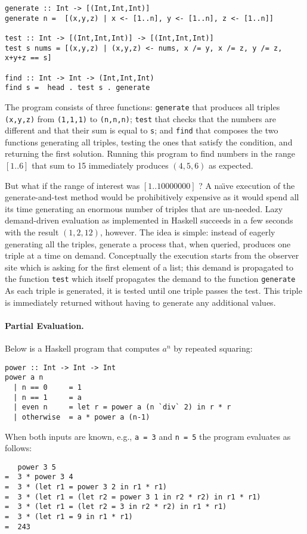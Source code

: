 \documentclass[sigplan]{acmart}
\newcommand{\h}[1]{\texttt{#1}}
\begin{document}
\begin{verbatim}
generate :: Int -> [(Int,Int,Int)]
generate n =  [(x,y,z) | x <- [1..n], y <- [1..n], z <- [1..n]]

test :: Int -> [(Int,Int,Int)] -> [(Int,Int,Int)]
test s nums = [(x,y,z) | (x,y,z) <- nums, x /= y, x /= z, y /= z, x+y+z == s]

find :: Int -> Int -> (Int,Int,Int)
find s =  head . test s . generate
\end{verbatim}

\noindent The program consists of three functions: \h{generate} that
produces all triples \h{(x,y,z)} from \h{(1,1,1)} to \h{(n,n,n)};
\h{test} that checks that the numbers are different and that their sum
is equal to \h{s}; and \h{find} that composes the two functions
generating all triples, testing the ones that satisfy the condition,
and returning the first solution. Running this program to find numbers
in the range $[1..6]$ that sum to 15 immediately produces $(4,5,6)$ as
expected.

But what if the range of interest was $[1..10000000]$ ? A na\"\i ve
execution of the generate-and-test method would be prohibitively
expensive as it would spend all its time generating an enormous number
of triples that are un-needed. Lazy demand-driven evaluation as
implemented in Haskell succeeds in a few seconds with the result
$(1,2,12)$, however. The idea is simple: instead of eagerly generating
all the triples, generate a process that, when queried, produces one
triple at a time on demand. Conceptually the execution starts from the
observer site which is asking for the first element of a list; this
demand is propagated to the function \h{test} which itself
propagates the demand to the function \h{generate}  As each triple
is generated, it is tested until one triple passes the test. This
triple is immediately returned without having to generate any
additional values.

\paragraph*{Partial Evaluation.}
Below is a Haskell program that computes $a^n$ by repeated squaring:
\begin{verbatim}
power :: Int -> Int -> Int
power a n
  | n == 0     = 1
  | n == 1     = a
  | even n     = let r = power a (n `div` 2) in r * r 
  | otherwise  = a * power a (n-1)
\end{verbatim}
When both inputs are known, e.g., \h{a = 3} and \h{n = 5}  the
program evaluates as follows:
\begin{verbatim}
   power 3 5
=  3 * power 3 4
=  3 * (let r1 = power 3 2 in r1 * r1)
=  3 * (let r1 = (let r2 = power 3 1 in r2 * r2) in r1 * r1)
=  3 * (let r1 = (let r2 = 3 in r2 * r2) in r1 * r1)
=  3 * (let r1 = 9 in r1 * r1)
=  243
\end{verbatim}
\end{document}
